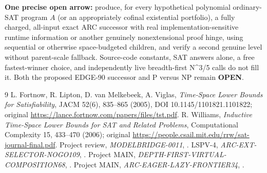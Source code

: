 \documentclass[11pt]{article}
\begin{document}
\textbf{One precise open arrow:} produce, for every hypothetical polynomial ordinary-SAT program $A$ (or an appropriately cofinal existential portfolio), a fully charged, all-input exact ARC successor with real implementation-sensitive runtime information or another genuinely nonextensional proof hinge, using sequential or otherwise space-budgeted children, and verify a second genuine level without parent-scale fallback. Source-code constants, SAT answers alone, a free fastest-winner choice, and independently live breadth-first N^{3/5} calls do not fill it. Both the proposed EDGE-90 successor and P versus NP remain \textbf{OPEN}.

\begin{thebibliography}{9}
 L. Fortnow, R. Lipton, D. van Melkebeek, A. Viglas, \emph{Time-Space Lower Bounds for Satisfiability}, JACM 52(6), 835--865 (2005), DOI 10.1145/1101821.1101822; original \url{https://lance.fortnow.com/papers/files/tst.pdf}.
 R. Williams, \emph{Inductive Time-Space Lower Bounds for SAT and Related Problems}, Computational Complexity 15, 433--470 (2006); original \url{https://people.csail.mit.edu/rrw/sat-journal-final.pdf}.
 Project review, \emph{MODELBRIDGE-0011}, .
 LSPV-4, \emph{ARC-EXT-SELECTOR-NOGO109}, .
 Project MAIN, \emph{DEPTH-FIRST-VIRTUAL-COMPOSITION68}, .
 Project MAIN, \emph{ARC-EAGER-LAZY-FRONTIER34}, .
\end{thebibliography}
\end{document}
